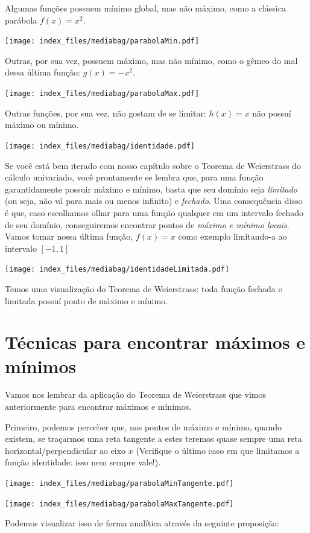\documentclass[
  letterpaper,
  DIV=11,
  numbers=noendperiod]{scrreprt}
\begin{document}
Algumas funções possuem mínimo global, mas não máximo, como a clássica
parábola \(f(x) = x^2\).

\texttt{[image: index\_files/mediabag/parabolaMin.pdf]}

Outras, por sua vez, possuem máximo, mas não mínimo, como o gêmeo do mal
dessa última função: \(g(x) = -x^2\).

\texttt{[image: index\_files/mediabag/parabolaMax.pdf]}

Outras funções, por sua vez, não gostam de se limitar: \(h(x) = x\) não
possuí máximo ou mínimo.

\texttt{[image: index\_files/mediabag/identidade.pdf]}

Se você está bem iterado com nosso capítulo sobre o Teorema de
Weierstrass do cálculo univariado, você prontamente se lembra que, para
uma função garantidamente possuir máximo e mínimo, basta que seu domínio
seja \emph{limitado} (ou seja, não vá para mais ou menos infinito) e
\emph{fechado}. Uma consequência disso é que, caso escolhamos olhar para
uma função qualquer em um intervalo fechado de seu domínio,
conseguiremos encontrar pontos de \emph{máximo e mínimo locais}. Vamos
tomar nossa última função, \(f(x) = x\) como exemplo limitando-a ao
intervalo \([-1,1]\)

\texttt{[image: index\_files/mediabag/identidadeLimitada.pdf]}

Temos uma visualização do Teorema de Weierstrass: toda função fechada e
limitada possuí ponto de máximo e mínimo.

\section{Técnicas para encontrar máximos e
mínimos}\label{tuxe9cnicas-para-encontrar-muxe1ximos-e-muxednimos}

Vamos nos lembrar da aplicação do Teorema de Weierstrass que vimos
anteriormente para encontrar máximos e mínimos.

Primeiro, podemos perceber que, nos pontos de máximo e mínimo, quando
existem, se traçarmos uma reta tangente a estes teremos quase sempre uma
reta horizontal/perpendicular ao eixo \(x\) (Verifique o último caso em
que limitamos a função identidade: isso nem sempre vale!).

\texttt{[image: index\_files/mediabag/parabolaMinTangente.pdf]}

\texttt{[image: index\_files/mediabag/parabolaMaxTangente.pdf]}

Podemos visualizar isso de forma analítica através da seguinte
proposição:
\end{document}
